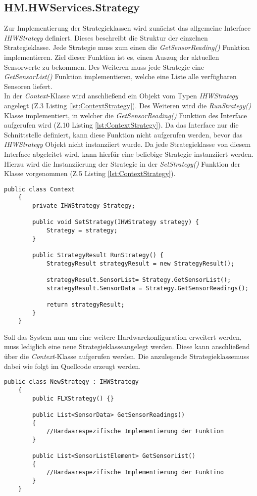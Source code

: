 \subsection{HM.HWServices.Strategy}
Zur Implementierung der Strategieklassen wird zunächst das allgemeine Interface \textit{IHWStrategy} definiert. Dieses beschreibt die Struktur der einzelnen Strategieklasse. Jede Strategie muss zum einen die \textit{GetSensorReading()} Funktion implementieren. Ziel dieser Funktion ist es, einen Auszug der aktuellen Sensorwerte zu bekommen. Des Weiteren muss jede Strategie eine \textit{GetSensorList()} Funktion implementieren, welche eine Liste alle verfügbaren Sensoren liefert.\\
In der \textit{Context}-Klasse wird anschließend ein Objekt vom Typen \textit{IHWStrategy} angelegt (Z.3 Listing \ref{lst:ContextStrategy}). Des Weiteren wird die \textit{RunStrategy()} Klasse implementiert, in welcher die \textit{GetSensorReading()} Funktion des Interface aufgerufen wird (Z.10 Listing \ref{lst:ContextStrategy}). Da das Interface nur die Schnittstelle definiert, kann diese Funktion nicht aufgerufen werden, bevor das \textit{IHWStrategy} Objekt nicht instanziiert wurde. Da jede Strategieklasse von diesem Interface abgeleitet wird, kann hierfür eine beliebige Strategie instanziiert werden. Hierzu wird die Instanziierung der Strategie in der \textit{SetStrategy()} Funktion der Klasse vorgenommen (Z.5 Listing \ref{lst:ContextStrategy}).
\begin{lstlisting}[caption={Context des Strategiepatterns}, label={lst:ContextStrategy}]
    public class Context
    {
        private IHWStrategy Strategy;
   
        public void SetStrategy(IHWStrategy strategy) { 
            Strategy = strategy; 
        }

        public StrategyResult RunStrategy() {
            StrategyResult strategyResult = new StrategyResult();

            strategyResult.SensorList= Strategy.GetSensorList();
            strategyResult.SensorData = Strategy.GetSensorReadings();

            return strategyResult;
        }
    }\end{lstlisting}  
Soll das System nun um eine weitere Hardwarekonfiguration erweitert werden, muss lediglich eine neue Strategieklasseangelegt werden. Diese kann anschließend über die \textit{Context}-Klasse aufgerufen werden. Die anzulegende Strategieklassemuss dabei wie folgt im Quellcode erzeugt werden. 
\begin{lstlisting}[caption={Implementierung einer weiteren Strategieklasse}, label={lst:NewStrategy}]
    public class NewStrategy : IHWStrategy
    {
        public FLXStrategy() {}

        public List<SensorData> GetSensorReadings() 
        {
            //Hardwarespezifische Implementierung der Funktion
        }
        
        public List<SensorListElement> GetSensorList() 
        { 
            //Hardwarespezifische Implementierung der Funktino  
        }
    }\end{lstlisting}  